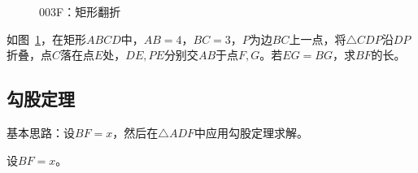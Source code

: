 

\begin{figure}[htbp]
  \centering
  \caption{003F：矩形翻折} \label{fig:003F}
\end{figure}

如图~\ref{fig:003F}，在矩形$ABCD$中，$AB = 4$，$BC = 3$，$P$为边$BC$上一点，将$\triangle CDP$沿$DP$折叠，点$C$落在点$E$处，$DE, PE$分别交$AB$于点$F, G$。若$EG = BG$，求$BF$的长。


\subsection{勾股定理} \label{subsec:003F-pyth}

基本思路：设$BF = x$，然后在$\triangle ADF$中应用勾股定理求解。

设$BF = x$。

